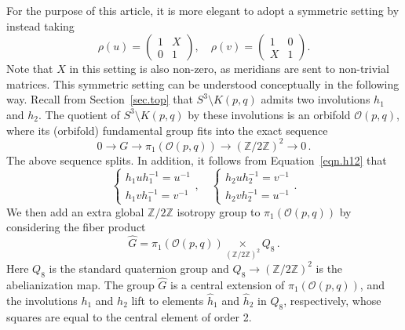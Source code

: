 \documentclass{amsart}
\newcommand{\Z}{\mathbb{Z}}
\newcommand{\calO}{\mathcal{O}}
\DeclareMathOperator{\Tr}{Tr}
\theoremstyle{definition}
\begin{document}
For the purpose of this article, it is more elegant to adopt a symmetric setting by instead taking
\begin{equation}\label{rho}
\rho(u)=\begin{pmatrix} 1 & X \\ 0 & 1\end{pmatrix},\quad \rho(v)=\begin{pmatrix} 1 & 0 \\ X & 1\end{pmatrix}.
\end{equation}
Note that $X$ in this setting is also non-zero, as meridians are sent to non-trivial matrices.
This symmetric setting can be understood conceptually in the following way. 
Recall from Section~\ref{sec.top} that $S^3 \setminus K(p,q)$ admits two involutions $h_1$ and $h_2$. The quotient of $S^3\setminus K(p,q)$ by these involutions is an orbifold $\calO(p,q)$, where its (orbifold) fundamental group fits into the exact sequence 
\begin{equation*}
0 \to G \to \pi_1(\calO(p,q))\to (\Z/2\Z)^2\to 0 \,.
\end{equation*}
The above sequence splits. In addition, it follows from Equation~\eqref{eqn.h12} that 
\begin{equation}\label{conjugation}
    \left\{
    \begin{array}{l}
         h_1 u h_1^{-1} = u^{-1} \\[2pt]
         h_1 v h_1^{-1} = v^{-1}
    \end{array}
    \right. , \quad 
    \left\{
    \begin{array}{l}
         h_2 u h_2^{-1} = v^{-1} \\[2pt]
         h_2 v h_2^{-1} = u^{-1}
    \end{array}
    \right.  .
\end{equation}
We then add an extra global $\Z/2\Z$ isotropy group to $\pi_1(\calO(p,q))$ by considering the fiber product 
\begin{equation*}
    \hat{G}=\pi_1(\calO(p,q)) \! \underset{(\Z/2\Z)^2}{\times} \! Q_8 \,.
\end{equation*}
Here $Q_8$ is the standard quaternion group  and $Q_8\to (\Z/2\Z)^2$ is the abelianization map.
The group $\hat{G}$ is a central extension of $\pi_1(\calO(p,q))$, and the involutions $h_1$ and $h_2$ lift to elements $\hat{h}_1$ and $\hat{h}_2$ in $Q_8$, respectively, whose squares are equal to the central element of order 2.
\end{document}
